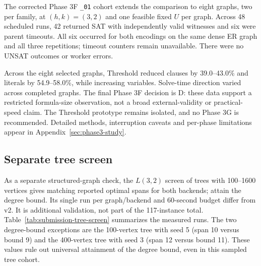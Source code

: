 The corrected Phase 3F \texttt{\_01} cohort extends the comparison to eight graphs,
two per family, at $(h,k)=(3,2)$ and one feasible fixed $U$ per graph.
Across 48 scheduled runs, 42 returned SAT with independently valid
witnesses and six were parent timeouts. All six occurred for both
encodings on the same dense ER graph and all three repetitions; timeout
counters remain unavailable. There were no UNSAT outcomes or worker
errors.
\begin{table}[htbp]
\centering\small
\caption{Phase 3F outcomes by encoding.}
\label{tab:phase3f-outcomes}

\end{table}
Across the eight selected graphs, Threshold reduced clauses by
39.0--43.0\% and literals by 54.9--58.0\%, while increasing variables.
Solve-time direction varied across completed graphs. The final Phase 3F
decision is D: these data support a restricted formula-size observation,
not a broad external-validity or practical-speed claim. The Threshold
prototype remains isolated, and no Phase 3G is recommended. Detailed
methods, interruption caveats and per-phase limitations appear in
Appendix~\ref{sec:phase3-study}.

\subsection{Separate tree screen}
As a separate structured-graph check, the $L(3,2)$ screen of
\TreeGraphCount{} trees with 100--1600 vertices gives matching reported
optimal spans for both backends; \TreeTightCount{} attain the degree
bound. Its single run per graph/backend and 60-second budget differ
from v2. It is additional validation, not part of the 117-instance total.
Table~\ref{tab:submission-tree-screen} summarizes the measured runs.
The two degree-bound exceptions are the 100-vertex tree with seed 5
(span 10 versus bound 9) and the 400-vertex tree with seed 3
(span 12 versus bound 11). These values rule out universal attainment
of the degree bound, even in this sampled tree cohort.

\begin{table}[htbp]
\centering\small
\caption{Separate $L(3,2)$ screen of 50 trees.}
\label{tab:submission-tree-screen}

\end{table}

